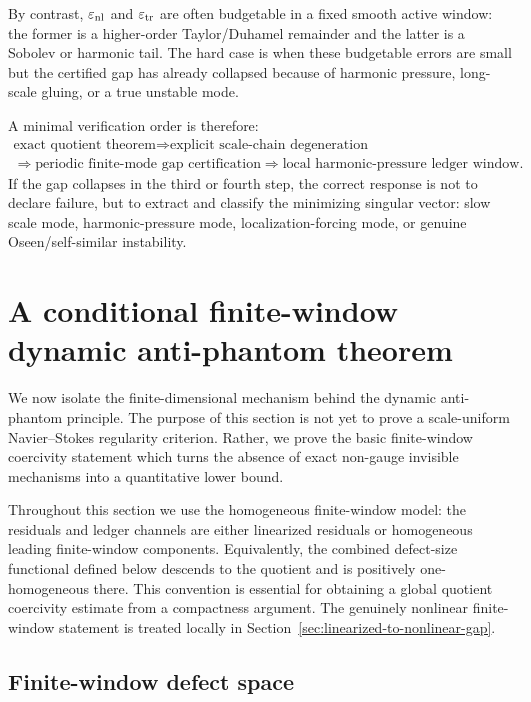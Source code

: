 \documentclass[11pt]{article}
\numberwithin{equation}{section}
\newcommand{\eps}{\varepsilon}
\begin{document}
By contrast, $\eps_{\rm nl}$ and $\eps_{\rm tr}$ are often budgetable in a fixed smooth active window: the former is a higher-order Taylor/Duhamel remainder and the latter is a Sobolev or harmonic tail.  The hard case is when these budgetable errors are small but the certified gap has already collapsed because of harmonic pressure, long-scale gluing, or a true unstable mode.

A minimal verification order is therefore:
\[
\begin{gathered}
\text{exact quotient theorem}
\Longrightarrow
\text{explicit scale-chain degeneration}\\
\Longrightarrow
\text{periodic finite-mode gap certification}
\Longrightarrow
\text{local harmonic-pressure ledger window}.
\end{gathered}
\]
If the gap collapses in the third or fourth step, the correct response is not to declare failure, but to extract and classify the minimizing singular vector: slow scale mode, harmonic-pressure mode, localization-forcing mode, or genuine Oseen/self-similar instability.



\section{A conditional finite-window dynamic anti-phantom theorem}\label{sec:conditional-dynamic-antiphantom}

We now isolate the finite-dimensional mechanism behind the dynamic
anti-phantom principle.  The purpose of this section is not yet to prove
a scale-uniform Navier--Stokes regularity criterion.  Rather, we prove
the basic finite-window coercivity statement which turns the absence of
exact non-gauge invisible mechanisms into a quantitative lower bound.

Throughout this section we use the homogeneous finite-window model: the
residuals and ledger channels are either linearized residuals or homogeneous
leading finite-window components.  Equivalently, the combined defect-size
functional defined below descends to the quotient and is positively
one-homogeneous there.  This convention is essential for obtaining a global
quotient coercivity estimate from a compactness argument.  The genuinely
nonlinear finite-window statement is treated locally in
Section~\ref{sec:linearized-to-nonlinear-gap}.

\subsection{Finite-window defect space}
\end{document}
